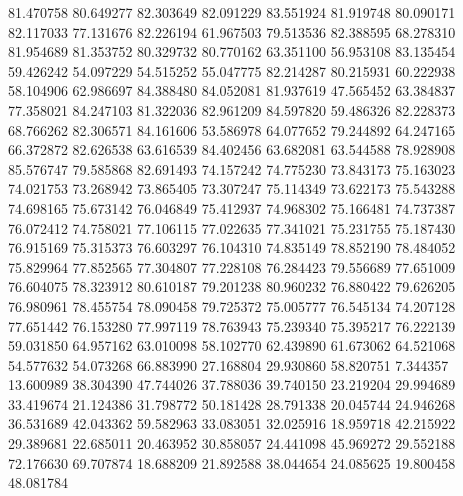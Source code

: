 81.470758
80.649277
82.303649
82.091229
83.551924
81.919748
80.090171
82.117033
77.131676
82.226194
61.967503
79.513536
82.388595
68.278310
81.954689
81.353752
80.329732
80.770162
63.351100
56.953108
83.135454
59.426242
54.097229
54.515252
55.047775
82.214287
80.215931
60.222938
58.104906
62.986697
84.388480
84.052081
81.937619
47.565452
63.384837
77.358021
84.247103
81.322036
82.961209
84.597820
59.486326
82.228373
68.766262
82.306571
84.161606
53.586978
64.077652
79.244892
64.247165
66.372872
82.626538
63.616539
84.402456
63.682081
63.544588
78.928908
85.576747
79.585868
82.691493
74.157242
74.775230
73.843173
75.163023
74.021753
73.268942
73.865405
73.307247
75.114349
73.622173
75.543288
74.698165
75.673142
76.046849
75.412937
74.968302
75.166481
74.737387
76.072412
74.758021
77.106115
77.022635
77.341021
75.231755
75.187430
76.915169
75.315373
76.603297
76.104310
74.835149
78.852190
78.484052
75.829964
77.852565
77.304807
77.228108
76.284423
79.556689
77.651009
76.604075
78.323912
80.610187
79.201238
80.960232
76.880422
79.626205
76.980961
78.455754
78.090458
79.725372
75.005777
76.545134
74.207128
77.651442
76.153280
77.997119
78.763943
75.239340
75.395217
76.222139
59.031850
64.957162
63.010098
58.102770
62.439890
61.673062
64.521068
54.577632
54.073268
66.883990
27.168804
29.930860
58.820751
7.344357
13.600989
38.304390
47.744026
37.788036
39.740150
23.219204
29.994689
33.419674
21.124386
31.798772
50.181428
28.791338
20.045744
24.946268
36.531689
42.043362
59.582963
33.083051
32.025916
18.959718
42.215922
29.389681
22.685011
20.463952
30.858057
24.441098
45.969272
29.552188
72.176630
69.707874
18.688209
21.892588
38.044654
24.085625
19.800458
48.081784
